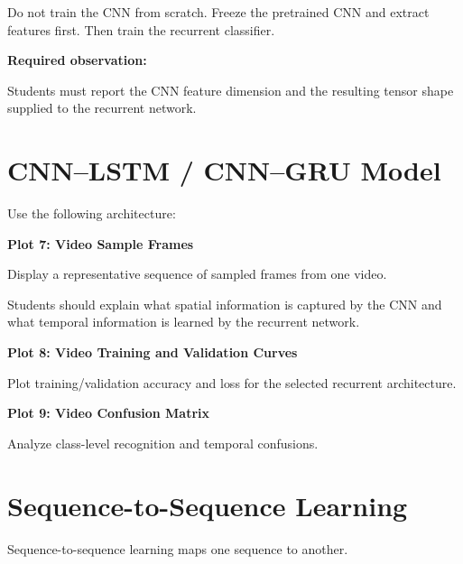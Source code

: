 \documentclass[10pt]{article}
\begin{document}
Do not train the CNN from scratch. Freeze the pretrained CNN and extract
features first. Then train the recurrent classifier.

\textbf{Required observation:}

Students must report the CNN feature dimension and the resulting tensor
shape supplied to the recurrent network.

\section{CNN--LSTM / CNN--GRU Model}

Use the following architecture:

\begin{center}
\end{center}

\textbf{Plot 7: Video Sample Frames}

Display a representative sequence of sampled frames from one video.

Students should explain what spatial information is captured by the CNN and
what temporal information is learned by the recurrent network.

\textbf{Plot 8: Video Training and Validation Curves}

Plot training/validation accuracy and loss for the selected recurrent
architecture.

\textbf{Plot 9: Video Confusion Matrix}

Analyze class-level recognition and temporal confusions.

\section{Sequence-to-Sequence Learning}

Sequence-to-sequence learning maps one sequence to another.
\end{document}
